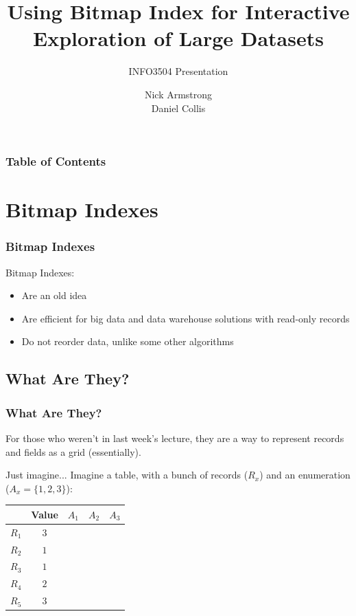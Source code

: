 \documentclass[11pt]{beamer}
\title[Bitmap Indexes for Large Datasets]{\textbf{Using Bitmap Index for Interactive Exploration of Large Datasets}}
\subtitle{INFO3504 Presentation}
\author{Nick Armstrong \\
        Daniel Collis}
\institute{University of Sydney}
\date{}
\begin{document}
\frame{\titlepage}

\begin{frame}
	\frametitle{Table of Contents}
	\tableofcontents
\end{frame}

\section[Bitmap Indexes]{Bitmap Indexes}

\begin{frame}
	\frametitle{Bitmap Indexes}
	
	Bitmap Indexes:
	\begin{itemize}
		\pause
		\item Are an old idea
		\pause
		\item Are efficient for big data and data warehouse solutions with read-only records
		\pause
		\item Do not reorder data, unlike some other algorithms
	\end{itemize}
\end{frame}

\subsection[Bitmap Indexes]{What Are They?}
\begin{frame}
	\frametitle{What Are They?}
	
	For those who weren't in last week's lecture, they \pause are a way to represent records and fields as a grid (essentially).
	
	\pause
	\begin{exampleblock}{Just imagine...}
		Imagine a table, with a bunch of records ($R_x$) and an enumeration ($A_x = \{1, 2, 3\}$):
		
		\pause
		\begin{tabular}{r|c|c|c|c}
				& \textbf{Value} & $A_1$ & $A_2$ & $A_3$ \\ \hline
			$R_1$ & $3$	& 	& 	& \\
			$R_2$ & $1$	& 	& 	& \\
			$R_3$ & $1$	& 	& 	& \\
			$R_4$ & $2$	& 	& 	& \\
			$R_5$ & $3$	& 	& 	& 
		\end{tabular}
	\end{exampleblock}
\end{frame}
\end{document}
